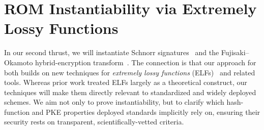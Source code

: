 \section{ROM Instantiability via Extremely Lossy Functions} \label{sec-pgg}
In our second thrust, we will instantiate Schnorr signatures~\cite{C:Schnorr89} and 
the Fujisaki–Okamoto hybrid-encryption transform~\cite{JC:FujOka13}. The connection is that our approach for both 
builds on new techniques for \emph{extremely lossy functions} (ELFs)~\cite{C:Zhandry16} 
and related tools. Whereas prior work treated ELFs largely as a theoretical construct, 
our techniques will make them directly relevant to standardized and widely deployed schemes. We aim not only to prove instantiability, but to clarify which hash-function and PKE properties deployed standards implicitly rely on, ensuring their security rests on transparent, scientifically-vetted criteria. %


